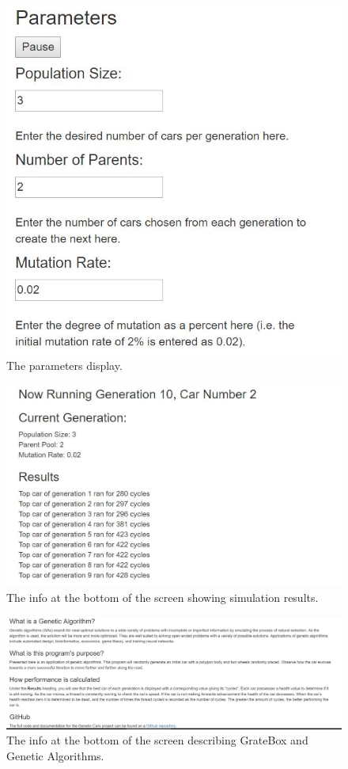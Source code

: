 \documentclass{article}
\begin{document}
\begin{figure}
  \includegraphics[width=\linewidth]{Images/GrateBoxParameters.JPG}
  \caption{The parameters display.}
  \label{fig:Param1}
\end{figure}

\begin{figure}
  \includegraphics[width=\linewidth]{Images/GrateBoxSimulationInfo.JPG}
  \caption{The info at the bottom of the screen showing simulation results.}
  \label{fig:Info1}
\end{figure}

\begin{figure}
  \includegraphics[width=\linewidth]{Images/GrateBoxInfo.JPG}
  \caption{The info at the bottom of the screen describing GrateBox and Genetic 
Algorithms.}
  \label{fig:Info2}
\end{figure}
\end{document}
